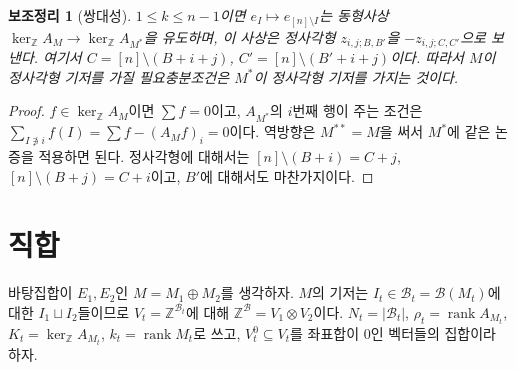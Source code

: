 \documentclass[11pt,a4paper]{article}
\theoremstyle{plain}
\newtheorem{lemma}[theorem]{보조정리}
\theoremstyle{definition}
\newcommand{\Z}{\mathbb Z}
\newcommand{\AM}{A_M}
\newcommand{\kerZ}{\ker_{\Z}\!A_M}
\newcommand{\bs}{\mathcal B}
\newcommand{\rank}{\operatorname{rank}}
\begin{document}
\begin{lemma}[쌍대성]\label{lem:dual}
$1\le k\le n-1$이면 $e_I\mapsto e_{[n]\setminus I}$는 동형사상 $\kerZ\to\ker_\Z A_{M^*}$을 유도하며, 이 사상은 정사각형 $z_{i,j;B,B'}$을 $-z_{i,j;C,C'}$으로 보낸다. 여기서 $C=[n]\setminus(B+i+j)$, $C'=[n]\setminus(B'+i+j)$이다. 따라서 $M$이 정사각형 기저를 가질 필요충분조건은 $M^*$이 정사각형 기저를 가지는 것이다.
\end{lemma}
\begin{proof}
$f\in\kerZ$이면 $\sum f=0$이고, $A_{M^*}$의 $i$번째 행이 주는 조건은 $\sum_{I\not\ni i}f(I)=\sum f-(\AM f)_i=0$이다. 역방향은 $M^{**}=M$을 써서 $M^*$에 같은 논증을 적용하면 된다. 정사각형에 대해서는 $[n]\setminus(B+i)=C+j$, $[n]\setminus(B+j)=C+i$이고, $B'$에 대해서도 마찬가지이다.
\end{proof}

\section{직합}\label{sec:dsum}
바탕집합이 $E_1,E_2$인 $M=M_1\oplus M_2$를 생각하자. $M$의 기저는 $I_t\in\bs_t=\bs(M_t)$에 대한 $I_1\sqcup I_2$들이므로 $V_t=\Z^{\bs_t}$에 대해 $\Z^{\bs}=V_1\otimes V_2$이다. $N_t=|\bs_t|$, $\rho_t=\rank A_{M_t}$, $K_t=\ker_\Z A_{M_t}$, $k_t=\rank M_t$로 쓰고, $V_t^0\subseteq V_t$를 좌표합이 $0$인 벡터들의 집합이라 하자.
\end{document}
